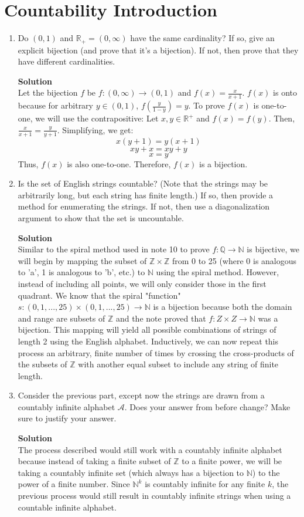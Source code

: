 \documentclass[11pt]{article}
\newcommand*{\Question}[1]{\section{#1}}
\newenvironment{Parts}{\begin{enumerate}[label=(\alph*)]}{\end{enumerate}}
\newcommand*{\Part}{\item}
\newenvironment{Answer}{\vspace{10pt}\begin{mdframed}\textbf{Solution}\\}{\end{mdframed}\vfill\pagebreak[3]}
\newenvironment{Answer}{\vspace{10pt}}{\vfill\pagebreak[3]}
\newcommand*{\N}{\mathbb{N}}
\newcommand*{\Z}{\mathbb{Z}}
\newcommand*{\Q}{\mathbb{Q}}
\newcommand*{\R}{\mathbb{R}}
\begin{document}
\Question{Countability Introduction}

\begin{Parts}
    \Part Do $(0, 1)$ and $\R_+ = (0, \infty)$ have the same cardinality? If so, give an explicit bijection (and prove that it's a bijection). If not, then prove that they have different cardinalities.
    \begin{Answer}
        Let the bijection $f$ be $f:(0, \infty) \rightarrow (0,1)$ and $f(x)=\frac{x}{x+1}$. $f(x)$ is onto because for arbitrary $y\in (0,1)$, $f(\frac{y}{1-y})=y$. To prove $f(x)$ is one-to-one, we will use the contrapositive: Let $x,y \in \R^+$ and $f(x)=f(y)$. Then, $\frac{x}{x+1}=\frac{y}{y+1}$. Simplifying, we get: $$x(y+1)=y(x+1)$$ $$xy+x=xy+y$$ $$x=y$$ Thus, $f(x)$ is also one-to-one. Therefore, $f(x)$ is a bijection.
    \end{Answer}

    \Part Is the set of English strings countable? (Note that the strings may be arbitrarily long, but each string has finite length.) If so, then provide a method for enumerating the strings. If not, then use a diagonalization argument to show that the set is uncountable.
    \begin{Answer}
        Similar to the spiral method used in note 10 to prove $f:\Q \rightarrow \N$ is bijective, we will begin by mapping the subset of $\Z \times \Z$ from 0 to 25 (where 0 is analogous to 'a', 1 is analogous to 'b', etc.) to $\N$ using the spiral method. However, instead of including all points, we will only consider those in the first quadrant. We know that the spiral "function" $s:(0,1,...,25)\times(0,1,...,25) \rightarrow \N$ is a bijection because both the domain and range are subsets of $\Z$ and the note proved that $f:Z \times Z \rightarrow \N$ was a bijection. This mapping will yield all possible combinations of strings of length 2 using the English alphabet. Inductively, we can now repeat this process an arbitrary, finite number of times by crossing the cross-products of the subsets of $\Z$ with another equal subset to include any string of finite length. 
    \end{Answer}

    \Part Consider the previous part, except now the strings are drawn from a countably infinite alphabet $\mathcal{A}$. Does your answer from before change? Make sure to justify your answer.
    \begin{Answer}
        The process described would still work with a countably infinite alphabet because instead of taking a finite subset of $\Z$ to a finite power, we will be taking a countably infinite set (which always has a bijection to $\N$) to the power of a finite number. Since $\N^k$ is countably infinite for any finite $k$, the previous process would still result in countably infinite strings when using a countable infinite alphabet.
    \end{Answer}
\end{Parts}

\end{document}
